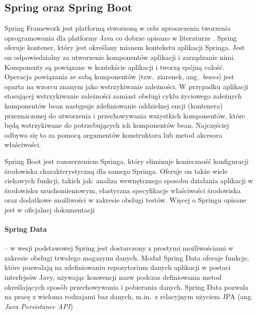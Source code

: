 \subsection{Spring oraz Spring Boot}

Spring Framework  jest platformą stworzoną w celu uproszczenia tworzenia oprogramowania dla platformy Java co dobrze opisano w literaturze \cite{spring}. Spring oferuje kontener, który jest określany mianem kontekstu aplikacji Springa. Jest on odpowiedzialny za utworzenie komponentów aplikacji i zarządzanie nimi. Komponenty są powiązane w kontekście aplikacji i tworzą spójną całość. Operacja powiązania ze sobą komponentów (tzw.\ ziarenek, ang.~\emph{beans}) jest oparta na wzorcu znanym jako wstrzykiwanie zależności. W przypadku aplikacji stosującej wstrzykiwanie zależności zamiast obsługi cyklu życiowego zależnych komponentów bean następuje zdefiniowanie oddzielnej encji (kontenera) przeznaczonej do utworzenia i przechowywania wszystkich komponentów, które będą wstrzykiwane do potrzebujących ich komponentów bean. Najczęściej odbywa się to za pomocą argumentów konstruktora lub metod akcesora właściwości. 

Spring Boot jest rozszerzeniem Springa, który eliminuje konieczność konfiguracji środowiska charakterystyczną dla samego Springa. Oferuje on także wiele ciekawych funkcji, takich jak: analiza wewnętrznego sposobu działania aplikacji w środowisku uruchomieniowym, elastyczna specyfikacje właściwości środowiska oraz dodatkowe możliwości w zakresie obsługi testów. Więcej o Springu opisane jest w oficjalnej dokumentacji \cite{springdoc}

\paragraph{Spring Data} -- w wesji podstawowej Spring jest dostarczony z prostymi możliwościami w zakresie obsługi trwałego magazynu danych. Moduł Spring Data oferuje funkcje, które pozwalają na zdefiniowaniu repozytorium danych aplikacji w postaci interfejsów Javy, używając konwencji nazw podczas definiowania metod określających sposób przechowywania i pobierania danych. Spring Data pozwala na pracę z wieloma rodzajami baz danych, m.in.\ z relacyjnym użyciem JPA (ang. \emph{Java Persistance API})

